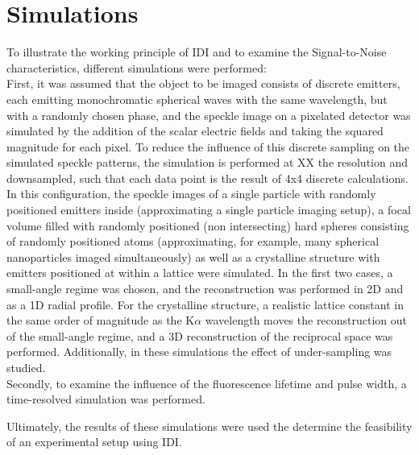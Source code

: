 \chapter{Simulations}
\label{chap:simulation}
To illustrate the working principle of IDI and to examine the Signal-to-Noise characteristics, different simulations were performed:\\
First, it was assumed that the object to be imaged consists of discrete emitters, each emitting monochromatic spherical waves with the same wavelength, but with a randomly chosen phase, and the speckle image on a pixelated detector was simulated by the addition of the scalar electric fields and taking the squared magnitude for each pixel. To reduce the influence of this discrete sampling on the simulated speckle patterns, the simulation is performed at XX the resolution and downsampled, such that each data point is the result of 4x4 discrete calculations.
In this configuration, the speckle images of a single particle with randomly positioned emitters inside (approximating a single particle imaging setup), a focal volume filled with randomly positioned (non intersecting) hard spheres consisting of randomly positioned atoms (approximating, for example, many spherical nanoparticles imaged simultaneously) as well as a crystalline structure with emitters positioned at within a lattice were simulated. In the first two cases, a small-angle regime was chosen, and the reconstruction was performed in 2D and as a 1D radial profile. For the crystalline structure, a realistic lattice constant in the same order of magnitude as the K$\alpha$ wavelength moves the reconstruction out of the small-angle regime, and a 3D reconstruction of the reciprocal space was performed.
Additionally, in these simulations the effect of under-sampling was studied.\\
Secondly, to examine the influence of the fluorescence lifetime and pulse width, a time-resolved simulation was performed.


Ultimately, the results of these simulations were used the determine the feasibility of an experimental setup using IDI.

